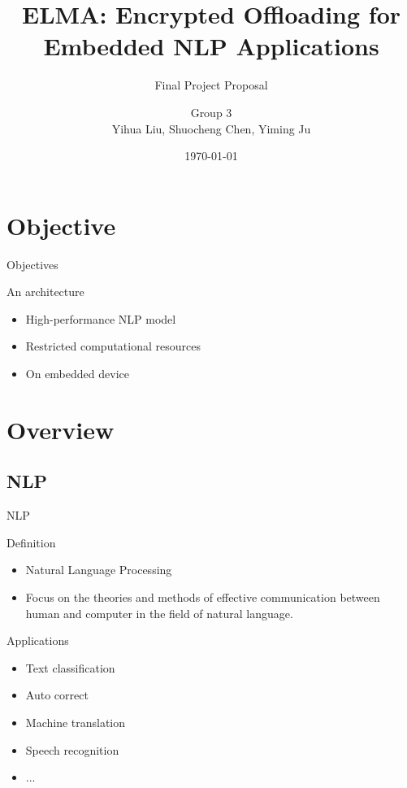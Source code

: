 \documentclass[12pt]{beamer}
\begin{document}
\title{ELMA: Encrypted Offloading for Embedded NLP Applications}
\subtitle{Final Project Proposal}
\author[Group 3]{Group 3\\[\baselineskip]Yihua Liu, Shuocheng Chen, Yiming Ju}
\date{\today}
\begin{frame}
    \titlepage
\end{frame}
\section{Objective}
\begin{frame}{Objectives}
    \begin{block}{An architecture}
        \begin{itemize}
            \item High-performance NLP model
            \item Restricted computational resources
            \item On embedded device
        \end{itemize}
    \end{block}
\end{frame}
\section{Overview}
\subsection{NLP}
\begin{frame}{NLP}
    \begin{block}{Definition}
        \begin{itemize}
            \item Natural Language Processing
            \item Focus on the theories and methods of effective communication between human and computer in the field of natural language.
        \end{itemize}
        
        
    \end{block}
    
    \begin{block}{Applications}
        \begin{itemize}
            \item Text classification
            \item Auto correct
            \item Machine translation
            \item Speech recognition
            \item ...
        \end{itemize}
    \end{block}

\end{frame}
\end{document}
